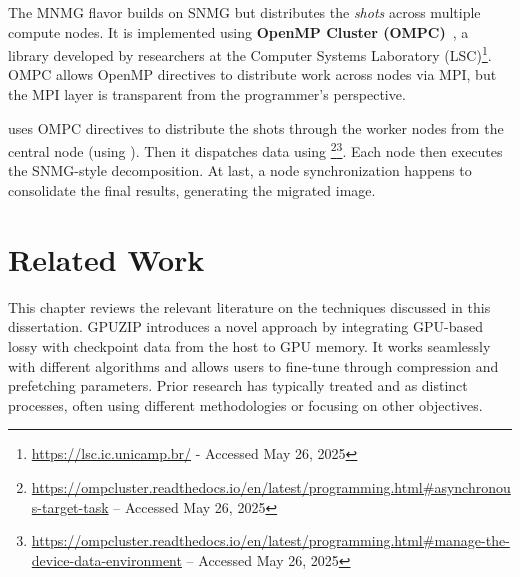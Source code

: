 \documentclass[Ingles]{ic-tese-v3}
\begin{document}
The MNMG flavor builds on SNMG but distributes the \textit{shots} across multiple compute nodes. It is implemented using \textbf{OpenMP Cluster (OMPC)}~\cite{ompc}, a library developed by researchers at the Computer Systems Laboratory (LSC)\footnote{\url{https://lsc.ic.unicamp.br/} - Accessed May 26, 2025}. OMPC allows OpenMP directives to distribute work across nodes via MPI, but the MPI layer is transparent from the programmer's perspective.

\awave uses OMPC directives to distribute the shots through the worker nodes from the central node (using ). Then it dispatches data using \footnote{\url{https://ompcluster.readthedocs.io/en/latest/programming.html\#asynchronous-target-task} -- Accessed May 26, 2025}\footnote{\url{https://ompcluster.readthedocs.io/en/latest/programming.html\#manage-the-device-data-environment} -- Accessed May 26, 2025}. Each node then executes the SNMG-style decomposition. At last, a node synchronization happens to consolidate the final results, generating the migrated image.


\chapter{ Related Work }
\label{ch:related_work}


This chapter reviews the relevant literature on the techniques discussed in this dissertation. GPUZIP introduces a novel approach by integrating GPU-based lossy \compression with \prefetching checkpoint data from the host to GPU memory. It works seamlessly with different \checkpointing algorithms and allows users to fine-tune through compression and prefetching parameters. Prior research has typically treated \compression and \prefetching as distinct processes, often using different methodologies or focusing on other objectives.
\end{document}
